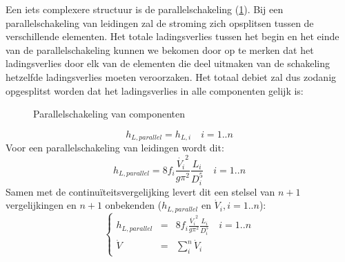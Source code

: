 Een iets complexere structuur is de parallelschakeling (\ref{fig:parallelschakeling}). Bij een parallelschakeling van leidingen zal de stroming zich opsplitsen tussen de verschillende elementen. Het totale ladingsverlies tussen het begin en het einde van de parallelschakeling kunnen we bekomen door op te merken dat het ladingsverlies door elk van de elementen die deel uitmaken van de schakeling hetzelfde ladingsverlies moeten veroorzaken. Het totaal debiet zal dus zodanig opgesplitst worden dat het ladingsverlies in alle componenten gelijk is:
\begin{figure}
	\centering
	
	\caption{Parallelschakeling van componenten}
	\label{fig:parallelschakeling}
\end{figure}
\begin{equation}
	h_{L,parallel} = h_{L,i} \quad i=1..n
\end{equation}
Voor een parallelschakeling van leidingen wordt dit:
\begin{equation}
	h_{L,parallel} = 8 f_i \frac{\dot{V_i}^2}{g \pi^2} \frac{L_i}{D^5_i} \quad i=1..n
\end{equation}
Samen met de continuïteitsvergelijking levert dit een stelsel van $n+1$ vergelijkingen en $n+1$ onbekenden ($h_{L,parallel}$ en $\dot{V}_i, i=1..n$):
\begin{equation}
	\left\{
	\begin{array}{lcl}
		h_{L,parallel} &=& 8 f_i \frac{\dot{V_i}^2}{g \pi^2} \frac{L_i}{D^5_i} \quad i=1..n \\
		\dot{V} &=& \sum_i^n \dot{V}_i
	\end{array}
	\right.
	\label{eqn:parallelschakeling}
\end{equation}

